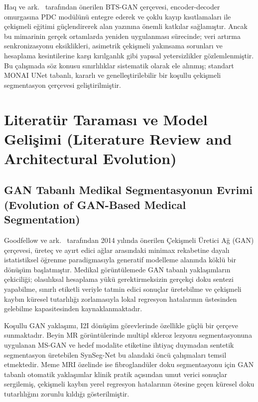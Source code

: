 \documentclass[10pt,journal,compsoc]{IEEEtran}
\begin{document}
Haq ve ark.\ \cite{haq2022bts} tarafından önerilen BTS-GAN çerçevesi, encoder-decoder omurgasına PDC modülünü entegre ederek ve çoklu kayıp kısıtlamaları ile çekişmeli eğitimi güçlendirerek alan yazınına önemli katkılar sağlamıştır. Ancak bu mimarinin gerçek ortamlarda yeniden uygulanması sürecinde; veri artırma senkronizasyonu eksiklikleri, asimetrik çekişmeli yakınsama sorunları ve hesaplama kesintilerine karşı kırılganlık gibi yapısal yetersizlikler gözlemlenmiştir. Bu çalışmada söz konusu sınırlılıklar sistematik olarak ele alınmış; standart MONAI UNet \cite{monai} tabanlı, kararlı ve genelleştirilebilir bir koşullu çekişmeli segmentasyon çerçevesi geliştirilmiştir.

\section{Literatür Taraması ve Model Gelişimi \textnormal{\small{(Literature Review and Architectural Evolution)}}}

\subsection{GAN Tabanlı Medikal Segmentasyonun Evrimi \textnormal{\small{(Evolution of GAN-Based Medical Segmentation)}}}

Goodfellow ve ark.\ \cite{goodfellow2014generative} tarafından 2014 yılında önerilen Çekişmeli Üretici Ağ (GAN) çerçevesi, üreteç ve ayırt edici ağlar arasındaki minimax rekabetine dayalı istatistiksel öğrenme paradigmasıyla generatif modelleme alanında köklü bir dönüşüm başlatmıştır. Medikal görüntülemede GAN tabanlı yaklaşımların çekiciliği; olasılıksal hesaplama yükü gerektirmeksizin gerçekçi doku sentezi yapabilme, sınırlı etiketli veriyle tatmin edici sonuçlar üretebilme ve çekişmeli kaybın küresel tutarlılığı zorlamasıyla lokal regresyon hatalarının üstesinden gelebilme kapasitesinden kaynaklanmaktadır.

Koşullu GAN yaklaşımı, I2I dönüşüm görevlerinde özellikle güçlü bir çerçeve sunmaktadır. Beyin MR görüntülerinde multipl skleroz lezyonu segmentasyonuna uygulanan MS-GAN \cite{zhang2018msgan} ve hedef modalite etiketine ihtiyaç duymadan sentetik segmentasyon üretebilen SynSeg-Net \cite{huo2018synsegnet} bu alandaki öncü çalışmaları temsil etmektedir. Meme MRI özelinde ise fibroglandüler doku segmentasyonu için GAN tabanlı otomatik yaklaşımlar klinik pratik açısından umut verici sonuçlar sergilemiş, çekişmeli kaybın yerel regresyon hatalarının ötesine geçen küresel doku tutarlılığını zorunlu kıldığı gösterilmiştir.
\end{document}
